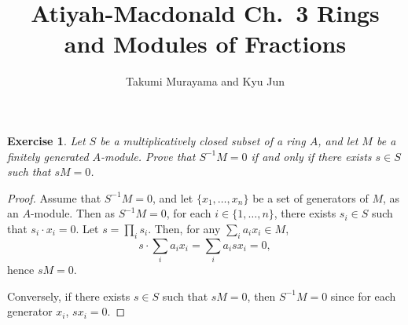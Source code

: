\documentclass[12pt,letterpaper]{article}
\title{Atiyah-Macdonald Ch.~3 Rings and Modules of Fractions}
\author{Takumi Murayama and Kyu Jun}
\newtheorem{problem}{Exercise}[section]
\theoremstyle{definition}
\theoremstyle{remark}
\numberwithin{figure}{problem}
\numberwithin{equation}{section}
\begin{document}
\maketitle
\setcounter{section}{3}
\begin{problem}\label{exc:3.1}
  Let $S$ be a multiplicatively closed subset of a ring $A$, and let $M$ be a finitely generated $A$-module. Prove that $S^{-1}M = 0$ if and only if there exists $s \in S$ such that $sM = 0$. 
\end{problem}
\begin{proof}
  Assume that $S^{-1}M = 0$, and let $\{x_1, \ldots, x_n\}$ be a set of
  generators of $M$, as an $A$-module. Then as $S^{-1}M = 0$, for each $i \in
  \{1, \ldots, n\}$, there exists $s_i \in S$ such that $s_i \cdot x_i=0$. Let $s= \prod_{i} s_i$. Then, for any $\sum_{i}a_ix_i \in M$,
  \begin{equation*}
    s \cdot \sum_{i}a_ix_i = \sum_{i}a_isx_i = 0,
  \end{equation*}
  hence $sM = 0$.
  \par Conversely, if there exists $s \in S$ such that $sM = 0$, then
  $S^{-1}M = 0$ since for each generator $x_i$, $sx_i = 0$.
\end{proof}
\end{document}
